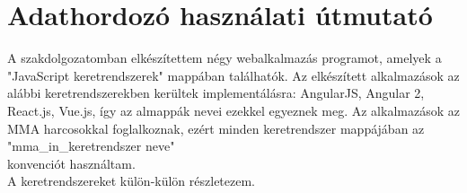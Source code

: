 \chapter*{Adathordozó használati útmutató}

A szakdolgozatomban elkészítettem négy webalkalmazás programot, amelyek a "JavaScript keretrendszerek" mappában találhatók. Az elkészített alkalmazások az alábbi keretrendszerekben kerültek implementálásra: AngularJS, Angular 2, React.js, Vue.js, így az almappák nevei ezekkel egyeznek meg. Az alkalmazások az MMA harcosokkal foglalkoznak, ezért minden keretrendszer mappájában az "mma\_in\_keretrendszer neve" \\ konvenciót használtam.\\

A keretrendszereket külön-külön részletezem. \\

